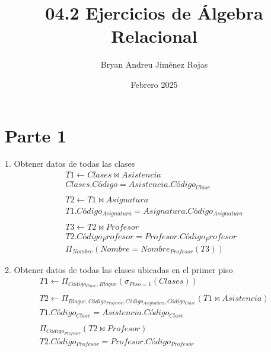 \documentclass{article}
\title{04.2 Ejercicios de Álgebra Relacional}
\author{Bryan Andreu Jiménez Rojas}
\date{Febrero 2025}
\begin{document}
\maketitle

\section{Parte 1}
\textnormal{1. Obtener datos de todas las clases}
\begin{equation*}
\begin{split}
        T1 \leftarrow Clases \bowtie Asistencia \\
        Clases.Código = Asistencia.Código_{Clase}
        \\\\
        T2 \leftarrow T1 \bowtie Asignatura \\
        T1.Código_{Asignatura} = Asignatura.Código_{Asignatura}
        \\\\
        T3 \leftarrow T2 \bowtie Profesor \\
        T2.Código_Profesor = Profesor.Código_Profesor \\
        \Pi_{Nombre}\left(Nombre = Nombre_{Profesor}\left(T3\right)\right)
\end{split}
\end{equation*}

\textnormal{2. Obtener datos de todas las clases ubicadas en el primer piso}
\begin{equation*}
\begin{split}
        T1 \leftarrow \Pi_{Código_{Clase}, Bloque} \left(\sigma_{Piso = 1}\left(Clases\right)\right)
        \\\\
        T2 \leftarrow \Pi_{Bloque, Código_{Profesor}, Código_{Asignatura}, Código_{Clase}}\left(T1 \bowtie Asistencia\right) \\
        T1.Código_{Clase} = Asistencia.Código_{Clase}
        \\\\
        \Pi_{Código_{Profesor}}\left(T2 \bowtie Profesor\right) \\
        T2.Código_{Profesor} = Profesor.Código_{Profesor}
\end{split}
\end{equation*}
\end{document}

